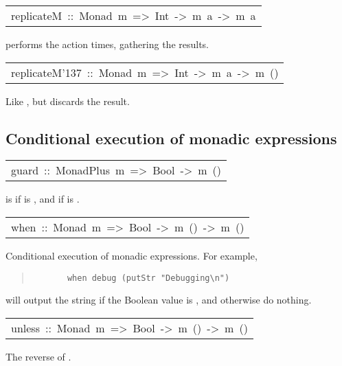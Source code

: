 \begin{haddockdesc}
\item[\begin{tabular}{@{}l}
replicateM\ ::\ Monad\ m\ =>\ Int\ ->\ m\ a\ ->\ m\ {\char 91}a{\char 93}
\end{tabular}]\haddockbegindoc
{} performs the action  times,
 gathering the results.
\par

\end{haddockdesc}
\begin{haddockdesc}
\item[\begin{tabular}{@{}l}
replicateM{\char '137}\ ::\ Monad\ m\ =>\ Int\ ->\ m\ a\ ->\ m\ ()
\end{tabular}]\haddockbegindoc
Like , but discards the result.
\par

\end{haddockdesc}
\subsection{Conditional execution of monadic expressions
}
\begin{haddockdesc}
\item[\begin{tabular}{@{}l}
guard\ ::\ MonadPlus\ m\ =>\ Bool\ ->\ m\ ()
\end{tabular}]\haddockbegindoc
{} is  if  is ,
 and  if  is .
\par

\end{haddockdesc}
\begin{haddockdesc}
\item[\begin{tabular}{@{}l}
when\ ::\ Monad\ m\ =>\ Bool\ ->\ m\ ()\ ->\ m\ ()
\end{tabular}]\haddockbegindoc
Conditional execution of monadic expressions. For example, 
\par
\begin{quote}
{\haddockverb\begin{verbatim}
       when debug (putStr "Debugging\n")
\end{verbatim}}
\end{quote}
will output the string  if the Boolean value  is ,
and otherwise do nothing.
\par

\end{haddockdesc}
\begin{haddockdesc}
\item[\begin{tabular}{@{}l}
unless\ ::\ Monad\ m\ =>\ Bool\ ->\ m\ ()\ ->\ m\ ()
\end{tabular}]\haddockbegindoc
The reverse of .
\par

\end{haddockdesc}
